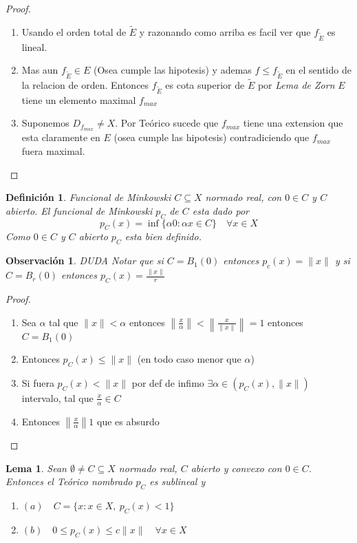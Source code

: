 \documentclass[10pt]{extarticle}
\theoremstyle{break}
\newtheorem{lemma}[theorem]{Lema}
\newtheorem*{remark}{Observación}
\newtheorem{definition}{Definición}[section]
\theoremstyle{definition}
\begin{document}
\begin{proof}
\begin{enumerate}
\item Usando el orden total de $\tilde{E}$ y razonando como arriba es facil ver que $f_{\tilde{E}}$ es lineal.
\item Mas aun $f_{\tilde{E}}\in E$ (Osea cumple las hipotesis) y ademas $f\leq f_{\tilde{E}}$ en el sentido de la relacion de orden. Entonces $f_{\tilde{E}}$ es cota superior de $\tilde{E}$ por \emph{Lema de Zorn} $E$ tiene un elemento maximal $f_{max}$
\item Suponemos $D_{f_{max}}\neq X$. Por Teórico sucede que $f_{max}$ tiene una extension que esta claramente en $E$ (osea cumple las hipotesis) contradiciendo que $f_{max}$ fuera maximal.
\end{enumerate}
\end{proof}




\begin{definition} Funcional de Minkowski
$C\subseteq X$ normado real, con $0\in C$ y $C$ abierto. El \emph{funcional de Minkowski} $p_{C}$ de $C$ esta dado por 
$$p_{C}(x)=\inf \{ \alpha 0:\alpha x\in C \}\quad \forall x\in X$$
Como $0\in C$ y $C$ abierto $p_{C}$ esta bien definido.
\end{definition}


\begin{remark} DUDA
Notar que si $C=B_{1}(0)$ entonces $p_{c}(x)=\lVert x \rVert$ y si $C=B_{r}(0)$ entonces $p_{C}(x)=\frac{\lVert x \rVert}{r}$
\end{remark}


\begin{proof}
\begin{enumerate}
\item
Sea $\alpha$ tal que $\lVert x \rVert < \alpha$ entonces $\left\lVert \frac{x}{\alpha } \right\rVert<\left\lVert \frac{x}{\lVert x \rVert} \right\rVert=1$ entonces $C=B_{1}(0)$
\item
Entonces $p_{C}(x)\leq \lVert x \rVert$ (en todo caso menor que $\alpha$)
\item
Si fuera $p_{C}(x)<\lVert x \rVert$ por def de infimo $\exists \alpha \in (p_{C}(x),\lVert x \rVert)$ intervalo, tal que $\frac{x}{\alpha }\in C$
\item
Entonces $\left\lVert \frac{x}{\alpha } \right\rVert1$ que es absurdo
\end{enumerate}
\end{proof}

\begin{lemma}
Sean $\emptyset \neq C\subseteq X$ normado real, $C$ abierto y convexo con $0\in C$. Entonces el Teórico nombrado $p_{C}$ es sublineal y
	\begin{enumerate}
		\item $(a) \quad C=\{ x:x\in X, \ p_{C}(x)<1 \}$
		\item $(b)\quad 0\leq p_{C}(x)\leq c\lVert x \rVert \quad\forall x\in X$
	\end{enumerate}
\end{lemma}
\end{document}

